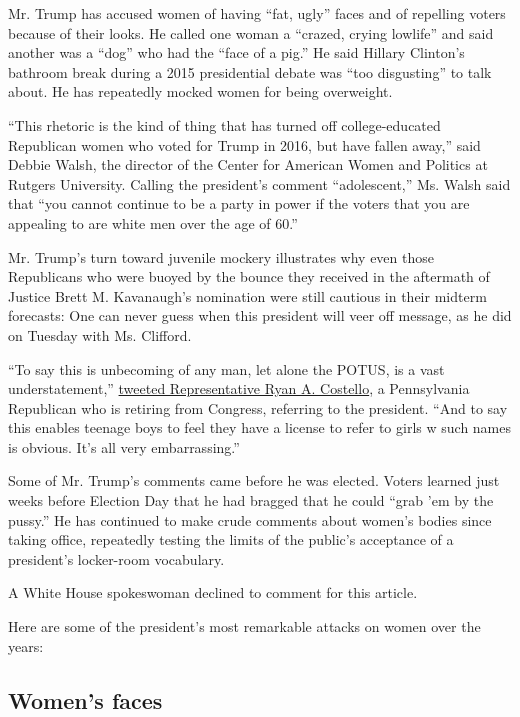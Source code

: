 Mr. Trump has accused women of having ``fat, ugly'' faces and of
repelling voters because of their looks. He called one woman a ``crazed,
crying lowlife'' and said another was a ``dog'' who had the ``face of a
pig.'' He said Hillary Clinton's bathroom break during a 2015
presidential debate was ``too disgusting'' to talk about. He has
repeatedly mocked women for being overweight.

``This rhetoric is the kind of thing that has turned off
college-educated Republican women who voted for Trump in 2016, but have
fallen away,'' said Debbie Walsh, the director of the Center for
American Women and Politics at Rutgers University. Calling the
president's comment ``adolescent,'' Ms. Walsh said that ``you cannot
continue to be a party in power if the voters that you are appealing to
are white men over the age of 60.''

Mr. Trump's turn toward juvenile mockery illustrates why even those
Republicans who were buoyed by the bounce they received in the aftermath
of Justice Brett M. Kavanaugh's nomination were still cautious in their
midterm forecasts: One can never guess when this president will veer off
message, as he did on Tuesday with Ms. Clifford.

``To say this is unbecoming of any man, let alone the POTUS, is a vast
understatement,''
\href{https://twitter.com/RyanCostello/status/1052224404124561408}{tweeted
Representative Ryan A. Costello}, a Pennsylvania Republican who is
retiring from Congress, referring to the president. ``And to say this
enables teenage boys to feel they have a license to refer to girls w
such names is obvious. It's all very embarrassing.''

Some of Mr. Trump's comments came before he was elected. Voters learned
just weeks before Election Day that he had bragged that he could ``grab
'em by the pussy.'' He has continued to make crude comments about
women's bodies since taking office, repeatedly testing the limits of the
public's acceptance of a president's locker-room vocabulary.

A White House spokeswoman declined to comment for this article.

Here are some of the president's most remarkable attacks on women over
the years:

\hypertarget{womens-faces}{%
\subsection{Women's faces}\label{womens-faces}}

